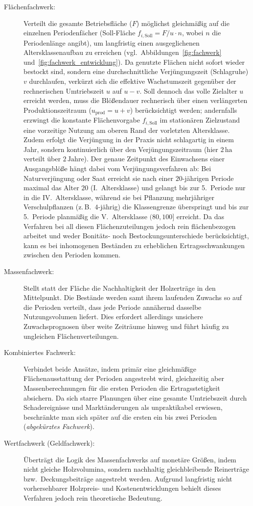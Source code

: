 \documentclass[twocolumn, paper=a4, fontsize=10pt]{scrartcl}
\begin{document}
\begin{description}
\item[Flächenfachwerk:] Verteilt die gesamte Betriebsfläche ($F$) möglichst gleichmäßig auf die einzelnen Periodenfächer (Soll-Fläche $f_{i,\text{Soll}} = F/u \cdot n$, wobei $n$ die Periodenlänge angibt), um langfristig einen ausgeglichenen Altersklassenaufbau zu erreichen (vgl.\ Abbildungen~\ref{fig:fachwerk} und~\ref{fig:fachwerk_entwicklung}). Da genutzte Flächen nicht sofort wieder bestockt sind, sondern eine durchschnittliche Verjüngungszeit (Schlagruhe) $v$ durchlaufen, verkürzt sich die effektive Wachstumszeit gegenüber der rechnerischen Umtriebszeit $u$ auf $u - v$. Soll dennoch das volle Zielalter $u$ erreicht werden, muss die Blößendauer rechnerisch über einen verlängerten Produktionszeitraum ($u_{\text{prod}} = u + v$) berücksichtigt werden; andernfalls erzwingt die konstante Flächenvorgabe $f_{i,\text{Soll}}$ im stationären Zielzustand eine vorzeitige Nutzung am oberen Rand der vorletzten Altersklasse. Zudem erfolgt die Verjüngung in der Praxis nicht schlagartig in einem Jahr, sondern kontinuierlich über den Verjüngungszeitraum (hier $2\,\text{ha}$ verteilt über $2\,\text{Jahre}$). Der genaue Zeitpunkt des Einwachsens einer Ausgangsblöße hängt dabei vom Verjüngungsverfahren ab: Bei Naturverjüngung oder Saat erreicht sie nach einer $20$-jährigen Periode maximal das Alter $20$ (I.~Altersklasse) und gelangt bis zur 5.~Periode nur in die IV.~Altersklasse, während sie bei Pflanzung mehrjähriger Verschulpflanzen (z.\,B.\ $4$-jährig) die Klassengrenze überspringt und bis zur 5.~Periode planmäßig die V.~Altersklasse $(80, 100]$ erreicht. Da das Verfahren bei all diesen Flächenzuteilungen jedoch rein flächenbezogen arbeitet und weder Bonitäts- noch Bestockungsunterschiede berücksichtigt, kann es bei inhomogenen Beständen zu erheblichen Ertragsschwankungen zwischen den Perioden kommen.
\item[Massenfachwerk:] Stellt statt der Fläche die Nachhaltigkeit der Holzerträge in den Mittelpunkt. Die Bestände werden samt ihrem laufenden Zuwachs so auf die Perioden verteilt, dass jede Periode annähernd dasselbe Nutzungsvolumen liefert. Dies erfordert allerdings unsichere Zuwachsprognosen über weite Zeiträume hinweg und führt häufig zu ungleichen Flächenverteilungen.
\item[Kombiniertes Fachwerk:] Verbindet beide Ansätze, indem primär eine gleichmäßige Flächenausstattung der Perioden angestrebt wird, gleichzeitig aber Massenberechnungen für die ersten Perioden die Ertragsstetigkeit absichern. Da sich starre Planungen über eine gesamte Umtriebszeit durch Schadereignisse und Marktänderungen als unpraktikabel erwiesen, beschränkte man sich später auf die ersten ein bis zwei Perioden (\emph{abgekürztes Fachwerk}).
\item[Wertfachwerk (Geldfachwerk):] Überträgt die Logik des Massenfachwerks auf monetäre Größen, indem nicht gleiche Holzvolumina, sondern nachhaltig gleichbleibende Reinerträge bzw.\ Deckungsbeiträge angestrebt werden. Aufgrund langfristig nicht vorhersehbarer Holzpreis- und Kostenentwicklungen behielt dieses Verfahren jedoch rein theoretische Bedeutung.
\end{description}
\end{document}

